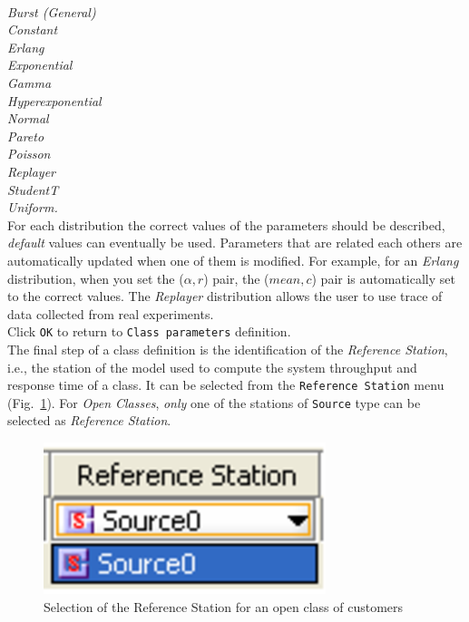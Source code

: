 \\
\emph{Burst (General)\\
Constant\\
Erlang\\
Exponential\\
Gamma\\
Hyperexponential\\
Normal\\
Pareto\\
Poisson\\
Replayer\\
StudentT\\
Uniform.\\
} For each distribution the correct values of the
parameters should be described, \emph{default} values can eventually be
used. Parameters that are related each others are automatically
updated when one of them is modified. For example, for an
\emph{Erlang} distribution, when you set the ($\alpha, r$) pair, the
($mean, c$) pair is automatically set to the correct values. The
\emph{Replayer} distribution
allows the user to use trace of data collected from real experiments.\\
Click \texttt{OK} to return to \texttt{Class parameters} definition.\\
The final step of a class definition is the identification of the
\emph{Reference Station}, i.e., the station of the model used to
compute the system throughput and response time of a class. It can be
selected from
the \texttt{Reference
Station} menu (Fig.~\ref{fig:selrefstat}). For
\emph{Open Classes}, \emph{only} one of the stations of
\texttt{Source} type can be selected as \emph{Reference Station}.
\begin{figure}[htb!]
    \begin{center}
        \includegraphics[scale=.5]{img/jsimg/3.6.eps}
    \end{center}
    \caption{Selection of the Reference Station for an open class of customers}
    \label{fig:selrefstat}
\end{figure}\\

